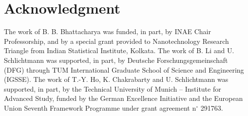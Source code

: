 \documentclass[journal,twoside]{IEEEtran}
\begin{document}
\section*{Acknowledgment}
The work of B. B. Bhattacharya was funded, in part, by INAE Chair
Professorship, and by a special grant provided to Nanotechnology
Research Triangle from Indian Statistical Institute, Kolkata.
The work of B. Li and U. Schlichtmann was supported, in part, by Deutsche
Forschungsgemeinschaft (DFG) through TUM International Graduate School of
Science and Engineering (IGSSE).
The work of T.-Y. Ho, K. Chakrabarty and U. Schlichtmann
was supported, in part, by the Technical University
of Munich -- Institute for Advanced Study, funded by the German
Excellence Initiative and the European Union Seventh Framework Programme under
grant agreement n$^\circ$ 291763.
\end{document}
